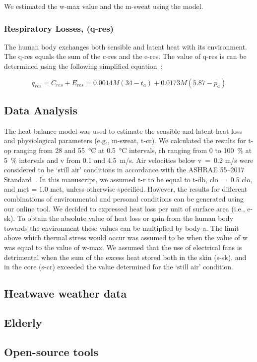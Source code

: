 We estimated the \ac{w-max} value and the \ac{m-sweat} using the  model.


\subsubsection{Respiratory Losses, (\acs{q-res})}
The human body exchanges both sensible and latent heat with its environment.
The \acf{q-res} equals the sum of the \ac{c-res} and the \ac{e-res}.
The value of \ac{q-res} is can be determined using the following simplified equation~\cite{ASHRA2017}:

\begin{equation}
    q_{res} = C_{res} + E_{res} = 0.0014M(34-t_{a}) + 0.0173M(5.87-p_{a})\label{eq:respiratory-losses}
\end{equation}

\subsection{Data Analysis}\label{subsec:data-analysis}

The heat balance model was used to estimate the sensible and latent heat loss and physiological parameters (e.g., \ac{m-sweat}, \ac{t-cr}).
We calculated the results for \ac{t-op} ranging from 28 and 55~°C at 0.5~°C intervals, \ac{rh} ranging from 0 to 100~\% at 5~\% intervals and \ac{v} from 0.1 and 4.5~m/s.
Air velocities below \ac{v}~=~0.2 m/s were considered to be `still air' conditions in accordance with the ASHRAE 55--2017 Standard~\cite{ashrae552017}.
In this manuscript, we assumed \ac{t-r} to be equal to \ac{t-db}, \ac{clo}~=~0.5 clo, and \ac{met} = 1.0 met, unless otherwise specified.
However, the results for different combinations of environmental and personal conditions can be generated using our online tool.
We decided to expressed heat loss per unit of surface area (i.e., \ac{e-sk}).
To obtain the absolute value of heat loss or gain from the human body towards the environment these values can be multiplied by \ac{body-a}.
The limit above which thermal stress would occur was assumed to be when the value of \ac{w} was equal to the value of \ac{w-max}.
We assumed that the use of electrical fans is detrimental when the sum of the excess heat stored both in the skin (\acs{s-sk}), and in the core (\acs{s-cr}) exceeded the value determined for the `still air' condition.

\subsection{Heatwave weather data}


\subsection{Elderly}


\subsection{Open-source tools}

